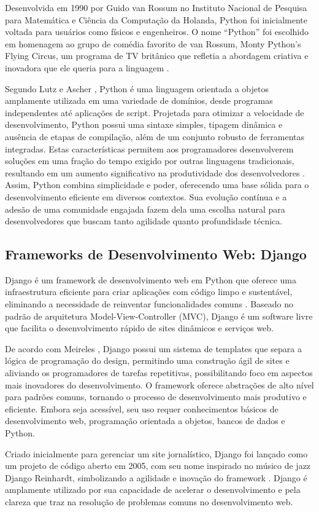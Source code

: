 Desenvolvida em 1990 por Guido van Rossum no Instituto Nacional de Pesquisa para Matemática e Ciência da Computação da Holanda, Python foi inicialmente voltada para usuários como físicos e engenheiros. O nome ``Python'' foi escolhido em homenagem ao grupo de comédia favorito de van Rossum, Monty Python's Flying Circus, um programa de TV britânico que refletia a abordagem criativa e inovadora que ele queria para a linguagem \cite{meireles2010}.

Segundo Lutz e Ascher \cite{lutz2007}, Python é uma linguagem orientada a objetos amplamente utilizada em uma variedade de domínios, desde programas independentes até aplicações de script. Projetada para otimizar a velocidade de desenvolvimento, Python possui uma sintaxe simples, tipagem dinâmica e ausência de etapas de compilação, além de um conjunto robusto de ferramentas integradas. Estas características permitem aos programadores desenvolverem soluções em uma fração do tempo exigido por outras linguagens tradicionais, resultando em um aumento significativo na produtividade dos desenvolvedores \cite{lutz2007}. Assim, Python combina simplicidade e poder, oferecendo uma base sólida para o desenvolvimento eficiente em diversos contextos. Sua evolução contínua e a adesão de uma comunidade engajada fazem dela uma escolha natural para desenvolvedores que buscam tanto agilidade quanto profundidade técnica.

\subsection{Frameworks de Desenvolvimento Web: Django}
Django é um framework de desenvolvimento web em Python que oferece uma infraestrutura eficiente para criar aplicações com código limpo e sustentável, eliminando a necessidade de reinventar funcionalidades comuns \cite{meireles2010}. Baseado no padrão de arquitetura Model-View-Controller (MVC), Django é um software livre que facilita o desenvolvimento rápido de sites dinâmicos e serviços web.

De acordo com Meireles \cite{meireles2010}, Django possui um sistema de templates que separa a lógica de programação do design, permitindo uma construção ágil de sites e aliviando os programadores de tarefas repetitivas, possibilitando foco em aspectos mais inovadores do desenvolvimento. O framework oferece abstrações de alto nível para padrões comuns, tornando o processo de desenvolvimento mais produtivo e eficiente. Embora seja acessível, seu uso requer conhecimentos básicos de desenvolvimento web, programação orientada a objetos, bancos de dados e Python.

Criado inicialmente para gerenciar um site jornalístico, Django foi lançado como um projeto de código aberto em 2005, com seu nome inspirado no músico de jazz Django Reinhardt, simbolizando a agilidade e inovação do framework \cite{meireles2010}. Django é amplamente utilizado por sua capacidade de acelerar o desenvolvimento e pela clareza que traz na resolução de problemas comuns no desenvolvimento web.

